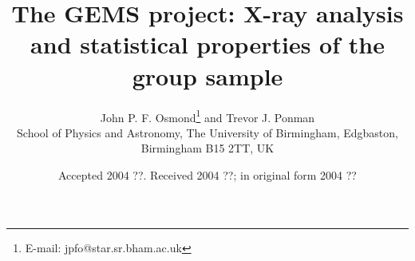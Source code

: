 \documentclass[usenatbib]{mn2e}
\title{The GEMS project: X-ray analysis and statistical properties of the group
       sample}
\author[J. P. F. Osmond \& T. J. Ponman]
  {John P. F. Osmond\thanks{E-mail: jpfo@star.sr.bham.ac.uk} and Trevor J.
   Ponman\\ School of Physics and Astronomy, The University of Birmingham,
   Edgbaston, Birmingham B15 2TT, UK\\}
\date{Accepted 2004 ??. Received 2004 ??; in original form 2004 ??}
\begin{document}


\newcommand{\betafit}{\ensuremath{\beta_{\mathrm{fit}}}}
\newcommand{\betaspec}{\ensuremath{\beta_{\mathrm{spec}}}}
\newcommand{\D}{\ensuremath{D}}
\newcommand{\Dec}{\ensuremath{Dec}}
\newcommand{\dengal}{\ensuremath{\bar{\rho}_{\mathrm{gal}}}}
\newcommand{\dom}{\ensuremath{L_{\mathrm{12}}}}
\newcommand{\e}{\ensuremath{e}}
\newcommand{\fgas}{\ensuremath{f_{\mathrm{gas}}}}
\newcommand{\fsp}{\ensuremath{f_{\mathrm{sp}}}}
\newcommand{\hfifty}{\ensuremath{h_{50}}}
\newcommand{\Hone}{\ensuremath{HI}}
\newcommand{\Hzero}{\ensuremath{H_{\mathrm{0}}}}
\newcommand{\K}{\ensuremath{K}}
\newcommand{\LB}{\ensuremath{L_{\mathrm{B}}}}
\newcommand{\LBGG}{\ensuremath{L_{\mathrm{BGG}}}}
\newcommand{\Lcut}{\ensuremath{L_{\mathrm{cut}}}}
\newcommand{\Lstar}{\ensuremath{L_{\star}}}
\newcommand{\LX}{\ensuremath{L_{\mathrm{X}}}}
\newcommand{\MB}{\ensuremath{M_{\mathrm{B}}}} 
\newcommand{\Ngal}{\ensuremath{N_{\mathrm{gal}}}}
\newcommand{\NH}{\ensuremath{N_{\mathrm{H}}}}
\newcommand{\omegam}{\ensuremath{\Omega_{\mathrm{m}}}}
\newcommand{\phistar}{\ensuremath{\phi_{\star}}}
\newcommand{\rcore}{\ensuremath{r_{\mathrm{core}}}}
\newcommand{\rcut}{\ensuremath{r_{\mathrm{cut}}}}  
\newcommand{\rext}{\ensuremath{r_{\mathrm{ext}}}}  
\newcommand{\rfh}{\ensuremath{r_{\mathrm{500}}}}
\newcommand{\rth}{\ensuremath{r_{\mathrm{200}}}}
\newcommand{\RA}{\ensuremath{RA}}
\newcommand{\sigmav}{\ensuremath{\sigma_{\mathrm{v}}}}
\newcommand{\Szero}{\ensuremath{S_{\mathrm{0}}}}
\newcommand{\TBGG}{\ensuremath{T_{\mathrm{BGG}}}}
\newcommand{\TX}{\ensuremath{T_{\mathrm{X}}}}
\newcommand{\vel}{\ensuremath{v}}
\newcommand{\Vfh}{\ensuremath{V_{\mathrm{500}}}}
\newcommand{\Z}{\ensuremath{Z}}

\newcommand{\LXrfh}{\ensuremath{L_{\mathrm{X}}(r_{\mathrm{500}})}}
\newcommand{\LXMDMB}{\ensuremath{L_{\mathrm{X}}\mathrm{(MDMB)}}}
\newcommand{\LXpLB}{\ensuremath{L_{\mathrm{X}}/L_{\mathrm{B}}}}
\newcommand{\LXpLBGG}{\ensuremath{L_{\mathrm{X}}/L_{\mathrm{BGG}}}}
\newcommand{\MpL}{\ensuremath{M/L}}
\newcommand{\rfhsigma}{\ensuremath{\rfh(\sigmav)}}
\newcommand{\rfhLB}{\ensuremath{r_{\mathrm{500}}(L_{\mathrm{B}})}}
\newcommand{\rfhTX}{\ensuremath{r_{\mathrm{500}}(T_{\mathrm{X}})}}

\newcommand{\ltsim}{\,\rlap{\raise 0.5ex\hbox{$<$}}{\lower 1.0ex\hbox{$\sim$}}\,}
\newcommand{\gtsim}{\,\rlap{\raise 0.5ex\hbox{$>$}}{\lower 1.0ex\hbox{$\sim$}}\,}
\end{document}
